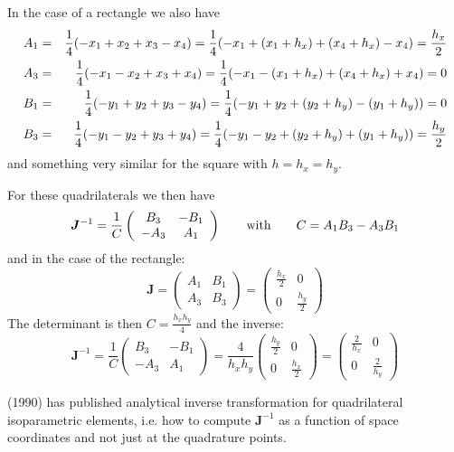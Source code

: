 In the case of a rectangle we also have
\begin{eqnarray}
A_1&=&\frac14(-x_1 +x_2 +x_3 -x_4)=\frac14(-x_1 +(x_1+h_x) +(x_4+h_x) -x_4) = \frac{h_x}{2} \nonumber\\
A_3&=&\frac14(-x_1 -x_2 +x_3 +x_4)=\frac14( -x_1 -(x_1+h_x) +(x_4+h_x) +x_4)  = 0 \nonumber\\
B_1 &=& \frac14 (-y_1 +y_2 +y_3 -y_4) = \frac14(-y_1 + y_2 + (y_2 +h_y) - (y_1+h_y)) = 0 \nonumber\\
B_3&=& \frac14(-y_1 -y_2 +y_3 +y_4) = \frac14 (-y_1 -y_2 + (y_2+h_y)+ (y_1+h_y)) = \frac{h_y}{2} \nonumber
\end{eqnarray}
and something very similar for the square with $h=h_x=h_y$.

For these quadrilaterals we then have
\[
{\bm J}^{-1} = \frac{1}{C}
\left(
\begin{array}{cc}
B_3  & -B_1  \\
-A_3  & A_1 
\end{array}
\right)
\qquad 
{\rm with }
\qquad
C= A_1B_3-A_3  B_1 
\]
and in the case of the rectangle:
\[
{\bm J} 
= \left(
\begin{array}{cc}
A_1  & B_1  \\
A_3  & B_3 
\end{array}
\right)
= \left(
\begin{array}{cc}
\frac{h_x}{2}  & 0  \\
0  & \frac{h_y}{2}
\end{array}
\right)
\]
The determinant is then $C=\frac{h_xh_y}{4}$ and the inverse:
\[
{\bm J}^{-1}
= 
\frac{1}{C}
\left(
\begin{array}{cc}
B_3  & -B_1  \\
-A_3  & A_1
\end{array}
\right)
= 
\frac{4}{h_xh_y}
\left(
\begin{array}{cc}
\frac{h_y}{2}  & 0  \\
0  & \frac{h_x}{2}
\end{array}
\right)
=
\left(
\begin{array}{cc}
\frac{2}{h_x}  & 0  \\
0  & \frac{2}{h_y}
\end{array}
\right)
\]


\begin{remark}
\textcite{hua90} (1990) has published analytical inverse transformation 
for quadrilateral isoparametric elements, i.e. how to compute ${\bm J}^{-1}$ 
as a function of space coordinates and not just at the quadrature points. 
\end{remark}


